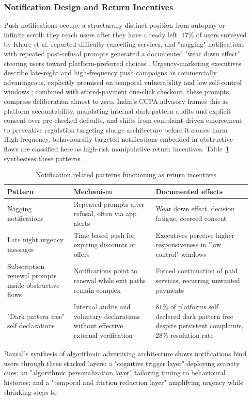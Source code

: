 \documentclass[11pt]{article}
\begin{document}
\subsubsection{Notification Design and Return Incentives}
\label{sec:notification_return_incentives} Push notifications occupy a structurally distinct position from autoplay or infinite scroll: they reach users after they have already left. $47\%$ of users surveyed by Khare et al. reported difficulty cancelling services, and "nagging" notifications with repeated post-refusal prompts generated a documented "wear down effect" steering users toward platform-preferred choices \parencites[8]{6295677}. Urgency-marketing executives describe late-night and high-frequency push campaigns as commercially advantageous, explicitly premised on temporal vulnerability and low self-control windows \parencites[138]{8745065}; combined with stored-payment one-click checkout, these prompts compress deliberation almost to zero. India's CCPA advisory frames this as platform accountability, mandating internal dark-pattern audits and explicit consent over pre-checked defaults, and shifts from complaint-driven enforcement to preventive regulation targeting sludge architecture before it causes harm \parencites[6]{6295677}[12]{6295677}. High-frequency, behaviourally-targeted notifications embedded in obstructive flows are classified here as high-risk manipulative return incentives. Table~\ref{tab:notif_patterns} synthesises these patterns. \begin{table}[H] \centering \caption{Notification related patterns functioning as return incentives} \label{tab:notif_patterns} \begin{tabular}{p{3.2cm}p{5.0cm}p{4.5cm}} \hline Pattern & Mechanism & Documented effects \\ \hline Nagging notifications & Repeated prompts after refusal, often via app alerts & Wear down effect, decision fatigue, coerced consent \parencites[8]{6295677} \\ Late night urgency messages & Time based push for expiring discounts or offers & Executives perceive higher responsiveness in "low control" windows \parencites[138]{8745065} \\ Subscription renewal prompts inside obstructive flows & Notifications point to renewal while exit paths remain complex & Forced continuation of paid services, recurring unwanted payments \parencites[8]{6295677} \\ "Dark pattern free" self declarations & Internal audits and voluntary declarations without effective external verification & $81\%$ of platforms self declared dark pattern free despite persistent complaints, 28\% resolution rate \parencites[12]{6295677} \\ \hline \end{tabular} \end{table} Bansal's synthesis of algorithmic advertising architecture shows notifications bind users through three stacked layers: a "cognitive trigger layer" deploying scarcity cues; an "algorithmic personalization layer" tailoring timing to behavioural histories; and a "temporal and friction reduction layer" amplifying urgency while shrinking steps to 
\end{document}
